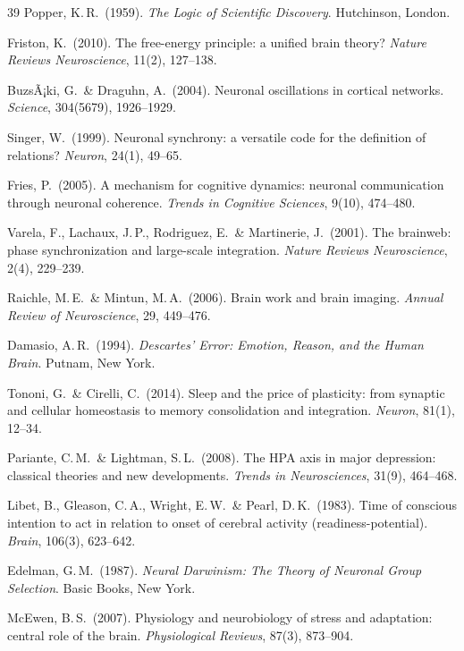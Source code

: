 ﻿\documentclass[12pt,a4paper]{report}
\theoremstyle{plain}
\theoremstyle{definition}
\theoremstyle{remark}
\begin{document}
\begin{thebibliography}{39}
		Popper, K.\,R.\ (1959).
		\textit{The Logic of Scientific Discovery}.
		Hutchinson, London.
		
		Friston, K.\ (2010).
		The free-energy principle: a unified brain theory?
		\textit{Nature Reviews Neuroscience}, 11(2), 127--138.
		
		BuzsÃ¡ki, G.\ \& Draguhn, A.\ (2004).
		Neuronal oscillations in cortical networks.
		\textit{Science}, 304(5679), 1926--1929.
		
		Singer, W.\ (1999).
		Neuronal synchrony: a versatile code for the definition of relations?
		\textit{Neuron}, 24(1), 49--65.
		
		Fries, P.\ (2005).
		A mechanism for cognitive dynamics: neuronal communication through
		neuronal coherence.
		\textit{Trends in Cognitive Sciences}, 9(10), 474--480.
		
		Varela, F., Lachaux, J.\,P., Rodriguez, E.\ \& Martinerie, J.\ (2001).
		The brainweb: phase synchronization and large-scale integration.
		\textit{Nature Reviews Neuroscience}, 2(4), 229--239.
		
		Raichle, M.\,E.\ \& Mintun, M.\,A.\ (2006).
		Brain work and brain imaging.
		\textit{Annual Review of Neuroscience}, 29, 449--476.
		
		Damasio, A.\,R.\ (1994).
		\textit{Descartes' Error: Emotion, Reason, and the Human Brain}.
		Putnam, New York.
		
		Tononi, G.\ \& Cirelli, C.\ (2014).
		Sleep and the price of plasticity: from synaptic and cellular homeostasis
		to memory consolidation and integration.
		\textit{Neuron}, 81(1), 12--34.
		
		Pariante, C.\,M.\ \& Lightman, S.\,L.\ (2008).
		The HPA axis in major depression: classical theories and new developments.
		\textit{Trends in Neurosciences}, 31(9), 464--468.
		
		Libet, B., Gleason, C.\,A., Wright, E.\,W.\ \& Pearl, D.\,K.\ (1983).
		Time of conscious intention to act in relation to onset of cerebral
		activity (readiness-potential).
		\textit{Brain}, 106(3), 623--642.
		
		Edelman, G.\,M.\ (1987).
		\textit{Neural Darwinism: The Theory of Neuronal Group Selection}.
		Basic Books, New York.
		
		McEwen, B.\,S.\ (2007).
		Physiology and neurobiology of stress and adaptation: central role of
		the brain.
		\textit{Physiological Reviews}, 87(3), 873--904.
		

\end{thebibliography}
\end{document}

